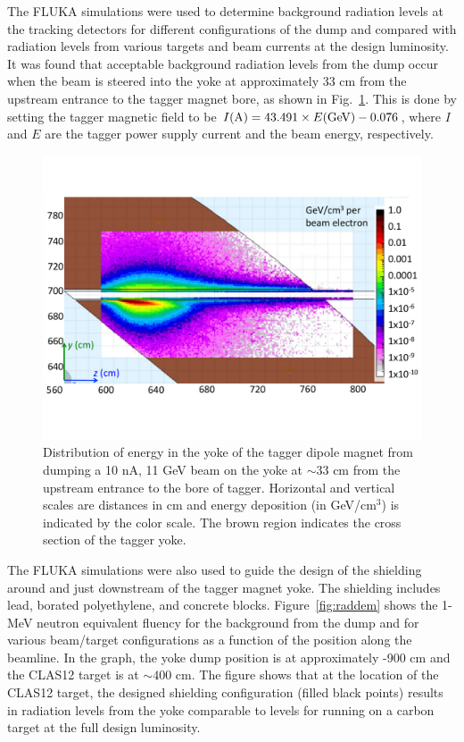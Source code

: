 The FLUKA simulations were used to determine background radiation levels at the tracking detectors for different configurations of the 
dump and compared with radiation levels from various targets and beam currents at the design luminosity.  It was found that acceptable 
background radiation levels from the dump occur when the beam is steered into the yoke at approximately 33 cm from the upstream 
entrance to the tagger magnet bore, as shown in Fig.~\ref{fig:yokedump}. This is done by setting the tagger magnetic field to be 
$I({\rm A}) = 43.491\times E({\rm GeV}) - 0.076$, where $I$ and $E$ are 
the tagger power supply current and the beam energy, respectively.   
%
\begin{figure}[hbt]
\begin{center}
\includegraphics[width=.45\textwidth]{YokeDump.pdf}
	\caption{Distribution of energy in the yoke of the tagger dipole magnet from dumping a 10 nA, 11 GeV beam on the yoke at 
	$\sim33$ cm from the upstream entrance to the bore of tagger. Horizontal and vertical scales are distances in cm and energy 
	deposition (in GeV/cm$^3$) is indicated by the color scale. The brown region indicates the cross section of the tagger yoke.}
\label{fig:yokedump}
\end{center}
\end{figure}

The FLUKA simulations were also used to guide the design of the shielding around and just downstream of the tagger magnet yoke. 
The shielding includes lead, borated polyethylene, and concrete blocks. Figure~\ref{fig:raddem} shows the 1-MeV neutron equivalent 
fluency for the background from the dump and for various beam/target configurations as a function of the position along the beamline. 
In the graph, the yoke dump position is at approximately -900 cm and the CLAS12 target is at $\sim400$ cm. The figure shows that at 
the location of the CLAS12 target, the designed shielding configuration (filled black points) results in radiation levels from the yoke 
comparable to levels for running on a carbon target at the full design luminosity.   

